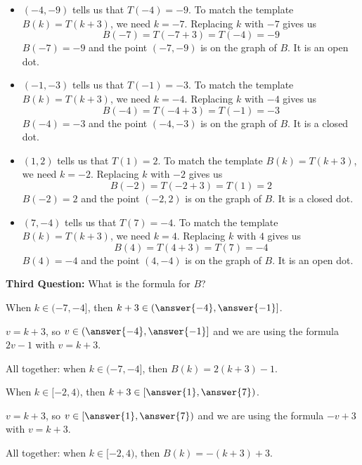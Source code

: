 \documentclass{ximera}
\begin{document}
\begin{itemize}

\item $(-4, -9)$ tells us that $T(-4) = -9$.   
To match the template $B(k) = T(k+3)$, we need $k=-7$.  Replacing $k$ with $-7$ gives us
\[ B(-7) = T(-7 + 3) = T(-4) = -9\]
$B(-7) = -9$ and the point $(-7, -9)$ is on the graph of $B$. It is an open dot.


\item $(-1, -3)$ tells us that $T(-1) = -3$.   
To match the template $B(k) = T(k+3)$, we need $k=-4$.  Replacing $k$ with $-4$ gives us
\[ B(-4) = T(-4 + 3) = T(-1) = -3\]
$B(-4) = -3$ and the point $(-4, -3)$ is on the graph of $B$. It is a closed dot.


\item $(1, 2)$ tells us that $T(1) = 2$.   
To match the template $B(k) = T(k+3)$, we need $k=-2$.  Replacing $k$ with $-2$ gives us
\[ B(-2) = T(-2 + 3) = T(1) = 2\]
$B(-2) = 2$ and the point $(-2, 2)$ is on the graph of $B$. It is a closed dot.


\item $(7, -4)$ tells us that $T(7) = -4$.   
To match the template $B(k) = T(k+3)$, we need $k=4$.  Replacing $k$ with $4$ gives us
\[ B(4) = T(4 + 3) = T(7) = -4\]
$B(4) = -4$ and the point $(4, -4)$ is on the graph of $B$. It is an open dot.


\end{itemize}














\textbf{\textcolor{purple!85!blue}{Third Question:}} What is the formula for $B$?



\begin{explanation}
When $k \in (-7,-4]$, then $k+3 \in \left(\answer{-4},\answer{-1}\right]$.  

$v=k+3$, so $v \in \left(\answer{-4},\answer{-1}\right]$ and we are using the formula $2v-1$ with $v=k+3$. 

All together: when $k \in (-7,-4]$, then $B(k) = 2(k+3)-1$.
\end{explanation}



\begin{explanation}
When $k \in [-2,4)$, then $k+3 \in \left[\answer{1},\answer{7}\right)$.  

$v=k+3$, so $v \in \left[\answer{1},\answer{7}\right)$ and we are using the formula $-v+3$ with $v=k+3$.

All together: when $k \in [-2,4)$, then $B(k) = -(k+3)+3$.
\end{explanation}
\end{document}
